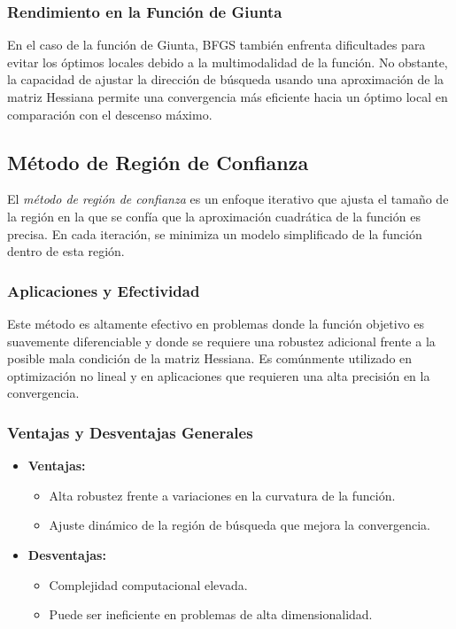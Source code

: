 \documentclass[fontsize=10pt]{article}
\begin{document}
\subsubsection{Rendimiento en la Función de Giunta}

En el caso de la función de Giunta, BFGS también enfrenta dificultades para evitar los óptimos locales debido a la multimodalidad de la función. No obstante, la capacidad de ajustar la dirección de búsqueda usando una aproximación de la matriz Hessiana permite una convergencia más eficiente hacia un óptimo local en comparación con el descenso máximo.

\subsection{Método de Región de Confianza}

El \textit{método de región de confianza} es un enfoque iterativo que ajusta el tamaño de la región en la que se confía que la aproximación cuadrática de la función es precisa. En cada iteración, se minimiza un modelo simplificado de la función dentro de esta región.

\subsubsection{Aplicaciones y Efectividad}

Este método es altamente efectivo en problemas donde la función objetivo es suavemente diferenciable y donde se requiere una robustez adicional frente a la posible mala condición de la matriz Hessiana. Es comúnmente utilizado en optimización no lineal y en aplicaciones que requieren una alta precisión en la convergencia.

\subsubsection{Ventajas y Desventajas Generales}

\begin{itemize}
    \item \textbf{Ventajas:} 
    \begin{itemize}
        \item Alta robustez frente a variaciones en la curvatura de la función.
        \item Ajuste dinámico de la región de búsqueda que mejora la convergencia.
    \end{itemize}
    \item \textbf{Desventajas:} 
    \begin{itemize}
        \item Complejidad computacional elevada.
        \item Puede ser ineficiente en problemas de alta dimensionalidad.
    \end{itemize}
\end{itemize}
\end{document}
